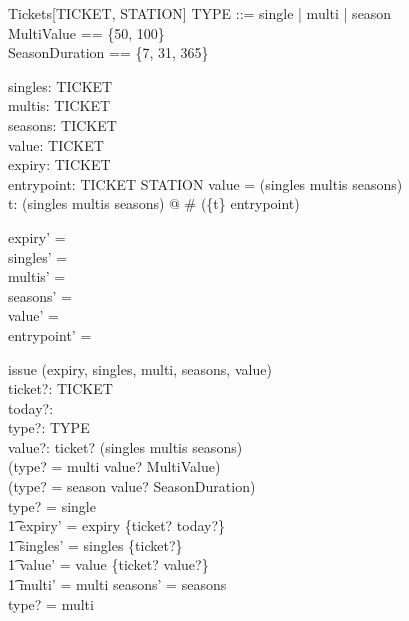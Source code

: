 \documentclass[11pt]{article}
\begin{document}
\begin{class}{Tickets[TICKET, STATION]}
\also
TYPE ::= single | multi | season \\
MultiValue == \{50, 100\} \\ 
SeasonDuration == \{7, 31, 365\}\\
\begin{state}
singles:  \power TICKET \\ 
multis:  \power TICKET \\ 
seasons:  \power TICKET \\ 
value: TICKET \pfun  \nat  \\ 
expiry: TICKET \pfun  \nat  \\ 
entrypoint: TICKET \pfun STATION 
\where
 \dom value = (singles \cup multis \cup seasons) \\ 
\forall t: (singles \cup multis \cup seasons) @ \# (\{t\} \dres
entrypoint) \end{state} \classbreak 
\begin{init}
expiry' = \emptyset \\ 
singles' = \emptyset \\ 
multis' = \emptyset \\ 
seasons' = \emptyset \\ 
value' = \emptyset \\ 
entrypoint' = \emptyset
\end{init} \classbreak 
\begin{op}{issue}
\Delta (expiry, singles, multi, seasons, value)\\
ticket?: TICKET \\ 
today?:  \nat  \\ 
type?: TYPE \\ 
value?:  \nat  
\where
 ticket? \notin (singles \cup multis \cup seasons) \land\\
       (type? = multi \implies value? \in MultiValue) \land\\
       (type? = season \implies value? \in SeasonDuration)\\
type? = single \implies \\
\t1 expiry' = expiry \cup \{ticket? \mapsto today?\} \land \\ 
\t1 singles' = singles \cup \{ticket?\} \land \\ 
\t1 value' = value \cup \{ticket? \mapsto value?\} \land\\ 
\t1 multi' = multi \land seasons' = seasons\\
type? = multi \implies\\

\end{op}
\end{class}
\end{document}
